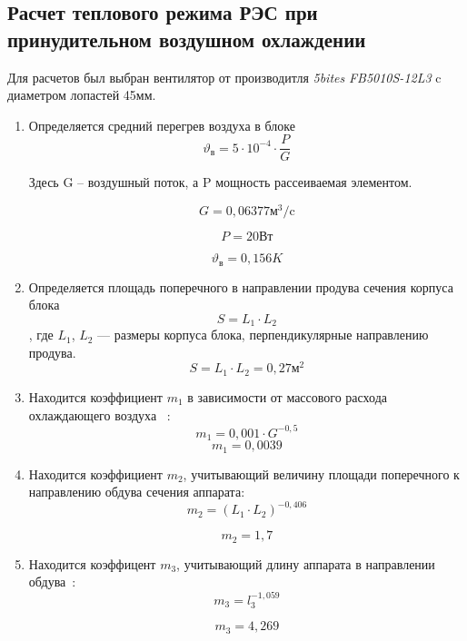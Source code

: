 \subsection{Расчет теплового режима РЭС при принудительном воздушном охлаждении}

Для расчетов был выбран вентилятор от производитля \textit{5bites}
\textit{FB5010S-12L3} c диаметром лопастей 45мм.

\begin{enumerate}[label={\arabic*.}]
\item Определяется средний перегрев воздуха в блоке
\begin{equation}
\vartheta\mathrm{_в} = 5 \cdot 10^{-4} \cdot \frac{P}{G}
\end{equation}

Здесь G – воздушный поток, а P мощность рассеиваемая элементом.

$$G = 0,06377\mathrm{м^3/c}$$

$$P = 20\mathrm{Вт}$$

$$\vartheta\mathrm{_в} = 0,156K$$

\item Определяется площадь поперечного
  в направлении продува сечения корпуса блока $$S= L_1 \cdot L_2$$,
  где $L_1$, $L_2$ — размеры корпуса блока,
  перпендикулярные направлению продува.
  $$S= L_1 \cdot L_2 =0,27\mathrm{м^2}$$

\item Находится коэффициент $m_1$ в зависимости
  от массового расхода охлаждающего воздуха ~\cite{Rotkop1976}:
  \begin{equation}
    m_1 = 0,001 \cdot G^{-0,5}
    \end{equation}
  $$m_1 = 0,0039$$

\item Находится коэффициент $m_2$,
  учитывающий величину площади поперечного
  к направлению обдува сечения аппарата\cite{Rotkop1976}:
  \begin{equation}
    m_2= (L_1 \cdot L_2) ^ {-0,406}
    \end{equation}

    $$m_2 = 1,7$$

  \item Находится коэффицент $m_3$,
    учитывающий длину аппарата в направлении обдува~\cite{Rotkop1976}:
    \begin{equation}
      m_3 = l_3 ^ {-1,059}
      \end{equation}

      $$m_3 = 4,269$$


\end{enumerate}
